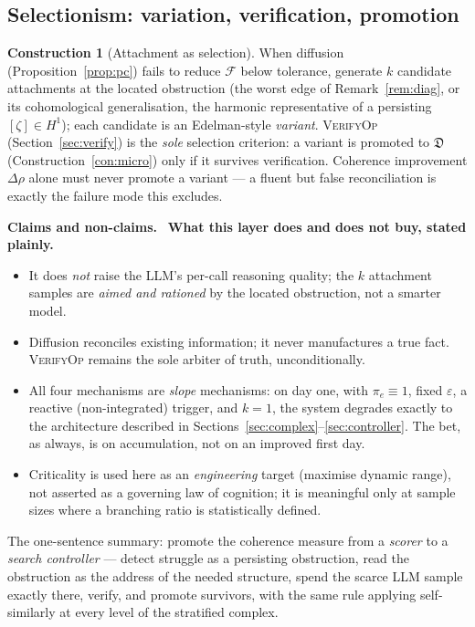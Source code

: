 \documentclass[11pt]{article}
\theoremstyle{definition}
\newtheorem{construction}[definition]{Construction}
\theoremstyle{plain}
\theoremstyle{remark}
\newcommand{\Hon}{\noindent\textbf{\color{honestycol}Claims and non-claims.}\ }
\newcommand{\Dop}{\mathfrak{D}}     %
\newcommand{\Hone}{H^{1}}
\begin{document}
\subsection{Selectionism: variation, verification, promotion}

\begin{construction}[Attachment as selection]
When diffusion (Proposition~\ref{prop:pc}) fails to reduce $\mathcal F$ below
tolerance, generate $k$ candidate attachments at the located obstruction (the
worst edge of Remark~\ref{rem:diag}, or its cohomological generalisation, the
harmonic representative of a persisting $[\zeta]\in\Hone$); each candidate is an
Edelman-style \emph{variant}. \textsc{VerifyOp} (Section~\ref{sec:verify}) is the
\emph{sole} selection criterion: a variant is promoted to $\Dop$
(Construction~\ref{con:micro}) only if it survives verification. Coherence
improvement $\Delta\rho$ alone must never promote a variant — a fluent but false
reconciliation is exactly the failure mode this excludes.
\end{construction}

\begin{hon}\Hon
\textbf{What this layer does and does not buy, stated plainly.}
\begin{itemize}[nosep]
\item It does \emph{not} raise the LLM's per-call reasoning quality; the $k$
  attachment samples are \emph{aimed and rationed} by the located obstruction, not a
  smarter model.
\item Diffusion reconciles existing information; it never manufactures a true fact.
  \textsc{VerifyOp} remains the sole arbiter of truth, unconditionally.
\item All four mechanisms are \emph{slope} mechanisms: on day one, with
  $\pi_e\equiv1$, fixed $\varepsilon$, a reactive (non-integrated) trigger, and
  $k=1$, the system degrades exactly to the architecture described in
  Sections~\ref{sec:complex}--\ref{sec:controller}. The bet, as always, is on
  accumulation, not on an improved first day.
\item Criticality is used here as an \emph{engineering} target (maximise dynamic
  range), not asserted as a governing law of cognition; it is meaningful only at
  sample sizes where a branching ratio is statistically defined.
\end{itemize}
The one-sentence summary: promote the coherence measure from a \emph{scorer} to a
\emph{search controller} — detect struggle as a persisting obstruction, read the
obstruction as the address of the needed structure, spend the scarce LLM sample
exactly there, verify, and promote survivors, with the same rule applying
self-similarly at every level of the stratified complex.
\end{hon}
\end{document}

